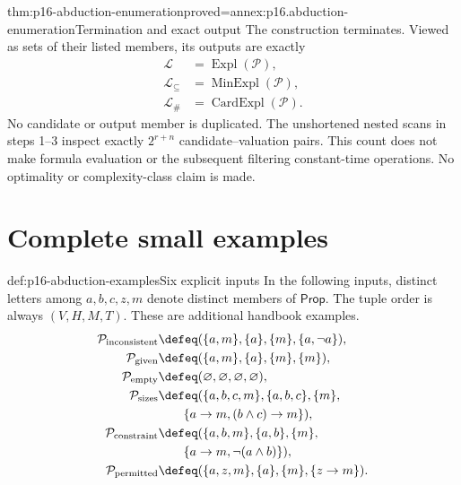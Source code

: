 \begin{hbtheorem}{thm:p16-abduction-enumeration}{proved=annex:p16.abduction-enumeration}{Termination and exact output}
The construction terminates. Viewed as sets of their listed members, its
outputs are exactly
\[
\begin{aligned}
 \mathcal L&=\operatorname{Expl}(\mathcal P),\\
 \mathcal L_{\subseteq}&=\operatorname{MinExpl}(\mathcal P),\\
 \mathcal L_{\#}&=\operatorname{CardExpl}(\mathcal P).
\end{aligned}
\]
No candidate or output member is duplicated. The unshortened nested scans
in steps 1--3 inspect exactly \(2^{r+n}\) candidate--valuation pairs.
This count does not make formula evaluation or the subsequent filtering
constant-time operations. No optimality or complexity-class claim is made.
\end{hbtheorem}

\section{Complete small examples}
\label{sec:p16-abduction-examples}

\begin{hbdefinition}{def:p16-abduction-examples}{Six explicit inputs}
In the following inputs, distinct letters among \(a,b,c,z,m\) denote
distinct members of \(\mathsf{Prop}\). The tuple order is always \((V,H,M,T)\).
These are additional handbook examples.
\[
\begin{aligned}
 \mathcal P_{\rm inconsistent}
   &\defeq(\{a,m\},\{a\},\{m\},\{a,\neg a\}),\\
 \mathcal P_{\rm given}
   &\defeq(\{a,m\},\{a\},\{m\},\{m\}),\\
 \mathcal P_{\rm empty}
   &\defeq(\varnothing,\varnothing,\varnothing,\varnothing),\\
 \mathcal P_{\rm sizes}
   &\defeq(\{a,b,c,m\},\{a,b,c\},\{m\},\\
   &\hspace{2em}\{a\to m,(b\land c)\to m\}),\\
 \mathcal P_{\rm constraint}
   &\defeq(\{a,b,m\},\{a,b\},\{m\},\\
   &\hspace{2em}\{a\to m,\neg(a\land b)\}),\\
 \mathcal P_{\rm permitted}
   &\defeq(\{a,z,m\},\{a\},\{m\},\{z\to m\}).
\end{aligned}
\]
\end{hbdefinition}

